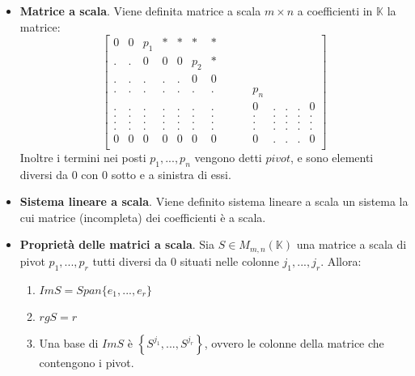\documentclass[12pt,a4paper,oneside]{book}
\begin{document}
\begin{itemize}

\item \textbf{Matrice a scala}. \linebreak
	  Viene definita matrice a scala $m\times n$ a coefficienti in $\mathbb{K}$ la matrice:
	  $$\begin{bmatrix}
	  0 & 0 & p_1 & * & * & * & * \\
	  . & . & 0 & 0 & 0 & p_2 & * \\
	  . & . & . & . & . & 0 & 0 \\
  	  . & . & . & . & . & . & . & \hspace{1cm} p_n \\
	  . & . & . & . & . & . & . & \hspace{1cm} 0 & . & . & . & 0 \\
	  . & . & . & . & . & . & . & \hspace{1cm} . & . & . & . & . \\
	  . & . & . & . & . & . & . & \hspace{1cm} . & . & . & . & . \\
	  . & . & . & . & . & . & . & \hspace{1cm} . & . & . & . & . \\
	  0 & 0 & 0 & 0 & 0 & 0 & 0 & \hspace{1cm} 0 & . & . & . & 0 \\
	  \end{bmatrix}$$
	  Inoltre i termini nei posti $p_1, ..., p_n$ vengono detti $pivot$, e sono elementi diversi da $0$ con 
	  $0$ sotto e a sinistra di essi.
	
\item \textbf{Sistema lineare a scala}. \linebreak
	  Viene definito sistema lineare a scala un sistema la cui matrice (incompleta) dei coefficienti è a 
	  scala.
	
\item \textbf{Proprietà delle matrici a scala}. \linebreak
	  Sia $S\in M_{m, n}(\mathbb{K})$ una matrice a scala di pivot $p_1, ..., p_r$ tutti diversi da $0$ 
	  situati nelle colonne $j_1, ..., j_r$. Allora:
	  
	  \begin{enumerate}
	  \item $ImS = Span\{e_1, ..., e_r\}$
	  \item $rgS = r$
	  \item Una base di $ImS$ è $\left\{S^{j_1}, ..., S^{j_r}\right\}$, ovvero le colonne della matrice
	  	    che contengono i pivot.
	  \end{enumerate}

\end{itemize}
	
\end{document}
